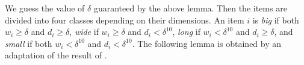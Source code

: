 \documentclass[10pt,a4paper]{amsart}
\newcommand{\ari}[1]{#1}
\newcommand{\akr}[1]{}
\renewcommand{\epsilon}{\varepsilon} %
\theoremstyle{definition}
\newcommand{\opt}{\mathtt{opt}}
\begin{document}
We guess the value of $\delta$ guaranteed by the above lemma. Then the items are divided into four classes depending on their dimensions. An item $i$ is \emph{big} if both $w_i \ge \delta$ and $d_i \ge \delta$, \emph{wide} if $w_i \ge \delta$ and $d_i < \delta^{10}$, \emph{long} if $w_i < \delta^{10}$ and $d_i \ge \delta$, and \emph{small} if both $w_i < \delta^{10}$ and $d_i < \delta^{10}$. The following lemma is obtained by an adaptation of the result of \cite{3d-strip-packing}.
\end{document}
